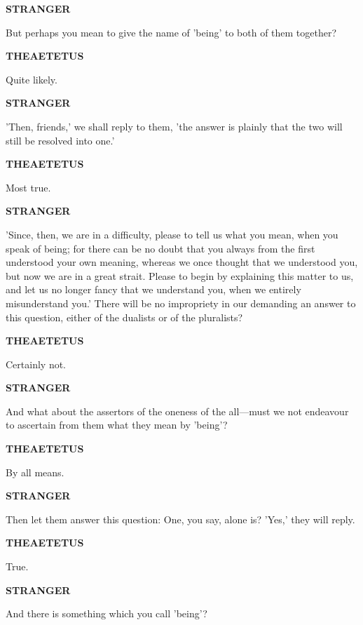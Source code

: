 \documentclass[11pt,letter]{article}
\begin{document}
\par \textbf{STRANGER}
\par   But perhaps you mean to give the name of 'being' to both of them together?

\par \textbf{THEAETETUS}
\par   Quite likely.

\par \textbf{STRANGER}
\par   'Then, friends,' we shall reply to them, 'the answer is plainly that the two will still be resolved into one.'

\par \textbf{THEAETETUS}
\par   Most true.

\par \textbf{STRANGER}
\par   'Since, then, we are in a difficulty, please to tell us what you mean, when you speak of being; for there can be no doubt that you always from the first understood your own meaning, whereas we once thought that we understood you, but now we are in a great strait. Please to begin by explaining this matter to us, and let us no longer fancy that we understand you, when we entirely misunderstand you.' There will be no impropriety in our demanding an answer to this question, either of the dualists or of the pluralists?

\par \textbf{THEAETETUS}
\par   Certainly not.

\par \textbf{STRANGER}
\par   And what about the assertors of the oneness of the all—must we not endeavour to ascertain from them what they mean by 'being'?

\par \textbf{THEAETETUS}
\par   By all means.

\par \textbf{STRANGER}
\par   Then let them answer this question:  One, you say, alone is? 'Yes,' they will reply.

\par \textbf{THEAETETUS}
\par   True.

\par \textbf{STRANGER}
\par   And there is something which you call 'being'?
\end{document}
